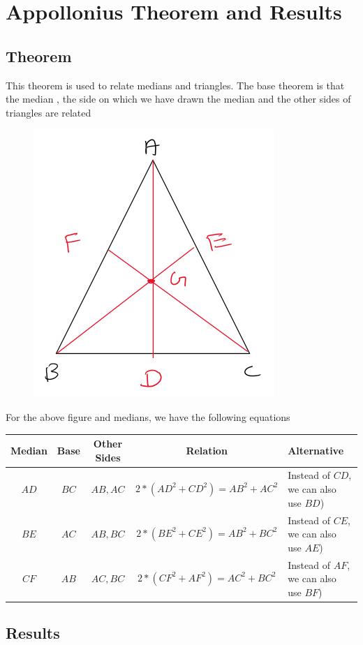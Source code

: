 \newpage

\section{Appollonius Theorem and Results}

\subsection*{Theorem}

This theorem is used to relate medians and triangles. The base theorem is that the median , the side on which we have drawn the median and the other sides of triangles are related

\begin{figure}[h!]
    \centering
    \includegraphics[width=0.3\linewidth]{Quant//Geometry//Images//Triangles/appollonius_figure.png}
\end{figure}

For the above figure and medians, we have the following equations

\begin{table}[h!]
    \centering
    \begin{tabular}{|| c | c | c | c | p{3cm} ||}
        \hline
         Median & Base & Other Sides & Relation & Alternative \\
         \hline
         $AD$ & $BC$ & $AB,AC$ & $2 * (AD^2 + CD^2 ) = AB^2 + AC^2$ & Instead of $CD$, we can also use $BD$) \\
         \hline
         $BE$ & $AC$ & $AB,BC$ & $2 * (BE^2 + CE^2 ) = AB^2 + BC^2$ & Instead of $CE$, we can also use $AE$) \\
         \hline
         $CF$ & $AB$ & $AC,BC$ & $2 * (CF^2 + AF^2 ) = AC^2 + BC^2$ & Instead of $AF$, we can also use $BF$) \\
         \hline
    \end{tabular}
\end{table}

\subsection*{Results}

